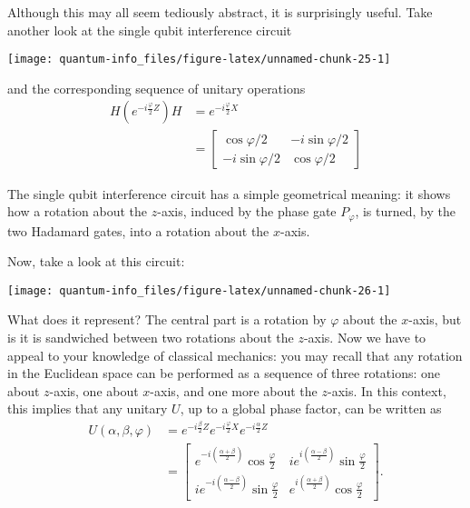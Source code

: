\documentclass[fleqn]{article}
\newenvironment{idea}{\noindent}{\medskip}
\begin{document}
Although this may all seem tediously abstract, it is surprisingly useful.
Take another look at the single qubit interference circuit

\begin{center}\texttt{[image: quantum-info\_files/figure-latex/unnamed-chunk-25-1]} \end{center}

and the corresponding sequence of unitary operations
\[
  \begin{aligned}
    H \left(
      e^{-i\frac{\varphi}{2}Z}
    \right) H
    &= e^{-i\frac{\varphi}{2}X}
  \\&= \begin{bmatrix}
      \cos\varphi/2 & -i\sin\varphi/2
    \\-i\sin\varphi/2 & \cos\varphi/2
    \end{bmatrix}
  \end{aligned}
\]

\begin{idea}

The single qubit interference circuit has a simple geometrical meaning: it shows how a rotation about the \(z\)-axis, induced by the phase gate \(P_\varphi\), is turned, by the two Hadamard gates, into a rotation about the \(x\)-axis.

\end{idea}

Now, take a look at this circuit:

\begin{center}\texttt{[image: quantum-info\_files/figure-latex/unnamed-chunk-26-1]} \end{center}

What does it represent?
The central part is a rotation by \(\varphi\) about the \(x\)-axis, but is it is sandwiched between two rotations about the \(z\)-axis.
Now we have to appeal to your knowledge of classical mechanics: you may recall that any rotation in the Euclidean space can be performed as a sequence of three rotations: one about \(z\)-axis, one about \(x\)-axis, and one more about the \(z\)-axis.
In this context, this implies that any unitary \(U\), up to a global phase factor, can be written as
\[
  \begin{aligned}
    U(\alpha, \beta, \varphi)
    &= e^{-i\frac{\beta}{2}Z} e^{-i\frac{\varphi}{2}X} e^{-i\frac{\alpha}{2}Z}
  \\&= \begin{bmatrix}
      e^{-i\left(\frac{\alpha+\beta}{2}\right)}\cos\frac{\varphi}{2}
      & ie^{i\left(\frac{\alpha-\beta}{2}\right)}\sin\frac\varphi{2}
    \\ie^{-i\left(\frac{\alpha-\beta}{2}\right)}\sin\frac\varphi{2}
      & e^{i\left(\frac{\alpha+\beta}{2}\right)}\cos\frac\varphi{2}
    \end{bmatrix}.
  \end{aligned}
\]
\end{document}
